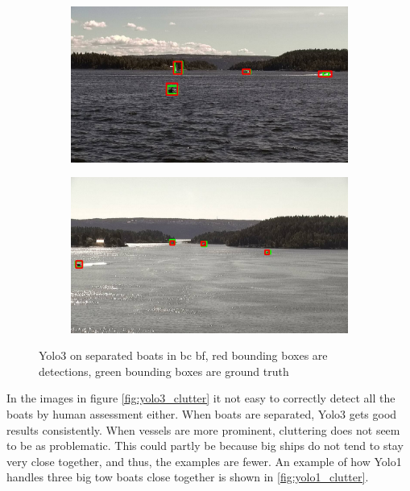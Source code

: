 \begin{figure}[h!]
\begin{subfigure}{.5\textwidth}
  \centering
  \includegraphics[width=0.8\linewidth]{discussion/good_ex/selected_08_14_frame1140.jpg}
\end{subfigure}%
\begin{subfigure}{.5\textwidth}
  \centering
  \includegraphics[width=.8\linewidth]{discussion/good_ex/selected_08_11_frame1380.jpg}
\end{subfigure}
\caption{Yolo3 on separated boats in bc bf, red bounding boxes are detections, green bounding boxes are ground truth}
\label{fig:yolo3_good_ex}
\end{figure}

In the images in figure \ref{fig:yolo3_clutter} it not easy to correctly detect all the boats by human assessment either. When boats are separated, Yolo3 gets good results consistently. When vessels are more prominent, cluttering does not seem to be as problematic. This could partly be because big ships do not tend to stay very close together, and thus, the examples are fewer. An example of how Yolo1 handles three big tow boats close together is shown in \ref{fig:yolo1_clutter}.

